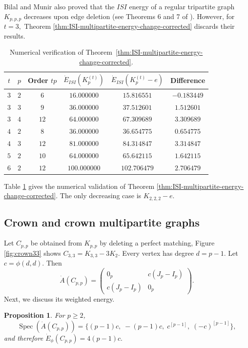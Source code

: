 \documentclass[12pt,twoside]{article}
\newcommand{\spec}{\operatorname{Spec}}
\newtheorem{proposition}[theorem]{Proposition}
\begin{document}
Bilal and Munir \cite{bilalpak} also proved that the $ISI$ energy of a regular tripartite graph $K_{p,p,p}$ decreases upon edge deletion (see Theorems 6 and 7 of \cite{bilalpak}). However, for $t=3,$ Theorem \ref{thm:ISI-multipartite-energy-change-corrected} discards their results.


\begin{table}[H]
	\centering
	\small
	\begin{tabular}{|c|c|c|c|c|c|}
		\hline
		$t$ & $p$ & Order $tp$ & $\dot E_{ISI}(K_p^{(t)})$ & $\dot E_{ISI}(K_p^{(t)}-e)$ & Difference\\
		\hline
		$3$&$2$&$6$&$16.000000$&$15.816551$&$-0.183449$\\
		\hline
		$3$&$3$&$9$&$36.000000$&$37.512601$&$1.512601$\\
		\hline
		$3$&$4$&$12$&$64.000000$&$67.309689$&$3.309689$\\
		\hline
		$4$&$2$&$8$&$36.000000$&$36.654775$&$0.654775$\\
		\hline
		$4$&$3$&$12$&$81.000000$&$84.314847$&$3.314847$\\
		\hline
		$5$&$2$&$10$&$64.000000$&$65.642115$&$1.642115$\\
		\hline
		$6$&$2$&$12$&$100.000000$&$102.706479$&$2.706479$\\
		\hline
	\end{tabular}
	\caption{Numerical verification of Theorem~\ref{thm:ISI-multipartite-energy-change-corrected}.}
	\label{tab:ISI-multipartite-edge-delete}
\end{table}

Table \ref{tab:ISI-multipartite-edge-delete} gives the numerical validation of Theorem \ref{thm:ISI-multipartite-energy-change-corrected}. The only decreasing case is $K_{2,2,2}-e$.
\subsection{Crown and crown multipartite graphs}

Let $C_{p,p}$ be obtained from $K_{p,p}$ by deleting a perfect matching, Figure \ref{fig:crown33} shows $C_{3,3}=K_{3,3}-3K_2$. Every vertex has degree $d=p-1$. Let
$
c=\phi(d,d).
$
Then
$$
\dot A(C_{p,p})
=
\begin{pmatrix}
	0_p&c(J_p-I_p)\\
	c(J_p-I_p)&0_p
\end{pmatrix}.
$$
Next, we discuss its weighted energy.
\begin{proposition}\label{prop:crown-bipartite-corrected}
	For $p\geq2$,
	$$
	\spec(\dot A(C_{p,p}))
	=
	\Big\{(p-1)c,\;-(p-1)c,\;c^{[p-1]},\;(-c)^{[p-1]}\Big\},
	$$
	and therefore
	$
	\dot E_\phi(C_{p,p})=4(p-1)c.
	$
\end{proposition}
\end{document}
